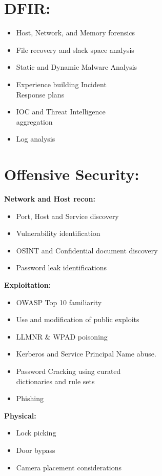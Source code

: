 \documentclass[a4paper,10pt]{article}
\begin{document}
\begin{multicols}{2}
\section{DFIR:}

\begin{itemize}[leftmargin=*]

    \item Host, Network, and Memory forensics
    \item File recovery and slack space analysis
    \item Static and Dynamic Malware Analysis
    \item Experience building Incident \\ Response plans
    \item IOC and Threat Intelligence \\ aggregation
    \item Log analysis
\end{itemize}

\columnbreak

\section{Offensive Security:}

\textbf{Network and Host recon:}
\begin{itemize}[leftmargin=*]
    \item Port, Host and Service discovery
    \item Vulnerability identification
    \item OSINT and Confidential document discovery
    \item Password leak identifications
\end{itemize}


\textbf{Exploitation:}
\begin{itemize}[leftmargin=*]
    \item OWASP Top 10 familiarity
    \item Use and modification of public exploits
    \item LLMNR \& WPAD poisoning
    \item Kerberos and Service Principal Name abuse.
    \item Password Cracking using curated \\ dictionaries and rule sets
    \item Phishing
\end{itemize}
        
\textbf{Physical:}
\begin{itemize}[leftmargin=*]
    \item Lock picking
    \item Door bypass
    \item Camera placement considerations
\end{itemize}


\end{multicols}
\end{document}
